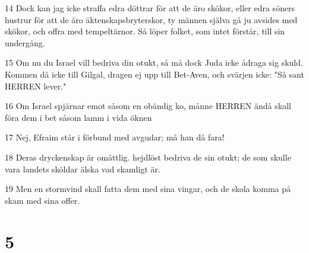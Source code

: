 \par 14 Dock kan jag icke straffa edra döttrar för att de äro skökor, eller edra söners hustrur för att de äro äktenskapsbryterskor, ty männen själva gå ju avsides med skökor, och offra med tempeltärnor. Så löper folket, som intet förstår, till sin undergång.
\par 15 Om nu du Israel vill bedriva din otukt, så må dock Juda icke ådraga sig skuld. Kommen då icke till Gilgal, dragen ej upp till Bet-Aven, och svärjen icke: "Så sant HERREN lever."
\par 16 Om Israel spjärnar emot såsom en obändig ko, månne HERREN ändå skall föra dem i bet såsom lamm i vida öknen
\par 17 Nej, Efraim står i förbund med avgudar; må han då fara!
\par 18 Deras dryckenskap är omåttlig. hejdlöst bedriva de sin otukt; de som skulle vara landets sköldar älska vad skamligt är.
\par 19 Men en stormvind skall fatta dem med sina vingar, och de skola komma på skam med sina offer.

\chapter{5}

